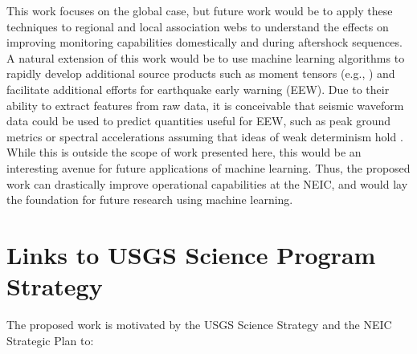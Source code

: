 \documentclass[12p]{article}
\begin{document}
This work focuses on the global case, but future work would be to apply these techniques to regional and local
association webs to understand the effects on improving monitoring capabilities domestically and during aftershock
sequences. A natural extension of this work would be to use machine learning algorithms to rapidly develop additional
source products such as moment tensors (e.g., \citet{Ross2018a}) and facilitate additional efforts for earthquake early
warning (EEW). Due to their ability to extract features from raw data, it is conceivable that seismic waveform data
could be used to predict quantities useful for EEW, such as peak ground metrics or spectral accelerations assuming that ideas of
weak determinism hold \citep{Goldberg2018}. While this is outside the scope of work presented here, this would be an
interesting avenue for future applications of machine learning. Thus, the proposed work can drastically improve
operational capabilities at the NEIC, and would lay the foundation for future research using machine learning.

\section{Links to USGS Science Program Strategy}
The proposed work is motivated by the USGS Science Strategy \citep{Holmes2013} and the NEIC Strategic Plan \citep{Hayes2019sp} to:
\end{document}
